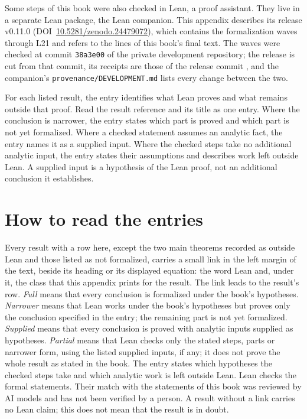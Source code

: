 
\hypertarget{lean-entry-top}{}%
Some steps of this book were also checked in Lean, a proof assistant. They
live in a separate Lean package, the Lean companion. This appendix describes its release
v0.11.0 (DOI~\href{https://doi.org/10.5281/zenodo.24479072}{10.5281/zenodo.24479072}),
which contains the formalization waves through L21 and refers to the lines
of this book's final text. The waves were checked at commit \texttt{38a3e00}
of the private development repository; the release is cut from that commit,
its receipts are those of the release commit \texttt{\lcCommit}, and the
companion's \texttt{provenance/DEVELOPMENT.md} lists every change between
the two.

For each listed result, the entry identifies what Lean proves and what
remains outside that proof. Read the result reference and its title as one
entry. Where the conclusion is narrower, the entry states which part is
proved and which part is not yet formalized. Where a checked statement assumes an analytic fact, the entry names it as
a supplied input. Where the checked steps take no additional analytic
input, the entry states their assumptions and describes work left outside
Lean. A supplied input is a hypothesis of the Lean proof, not an additional
conclusion it establishes.

\section{How to read the entries}\label{S:lean-how-to-read}

Every result with a row here, except the two main theorems recorded as outside
Lean and those listed as not formalized, carries
a small link in the left margin of the text, beside its heading or its
displayed equation: the word Lean and, under it, the class that this
appendix prints for the result. The link leads to the result's row.
\emph{Full} means that every conclusion is formalized under the book's
hypotheses.
\emph{Narrower} means that Lean works under the book's hypotheses but
proves only the conclusion specified in the entry; the remaining part is
not yet formalized.
\emph{Supplied} means that every conclusion is proved with analytic inputs
supplied as hypotheses.
\emph{Partial} means that Lean checks only the stated steps, parts or
narrower form, using the listed supplied inputs, if any; it does not prove
the whole result as stated in the book. The entry states which hypotheses
the checked steps take and which analytic work is left outside Lean.
Lean checks the formal statements. Their match with the statements of this
book was reviewed by AI models and has not been verified by a person. A
result without a link carries no Lean claim; this does not mean that the
result is in doubt.

